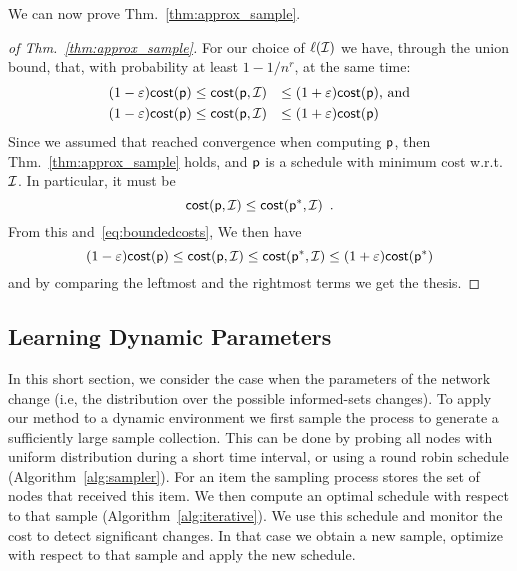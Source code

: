 We can now prove Thm.~\ref{thm:approx_sample}.
\begin{proof}[of Thm.~\ref{thm:approx_sample}]
	For our choice of $\ell(\mathcal{I})$ we have, through the union bound, that,
	with probability at least $1-1/n^r$, at the same time:
	\begin{align}\label{eq:boundedcosts}
		(1-\varepsilon)\mathsf{cost}(\mathsf{p})&\leq \mathsf{cost}(\mathsf{p},\mathcal{I}) &\le
		(1+\varepsilon)\mathsf{cost}(\mathsf{p}) & \mbox{, and}\\
		(1-\varepsilon)\mathsf{cost}(\mathsf{p})&\leq \mathsf{cost}(\mathsf{p},\mathcal{I}) &\le
		(1+\varepsilon)\mathsf{cost}(\mathsf{p})&\nonumber
	\end{align}
	Since we assumed that \algonameapx reached convergence when computing
	$\mathsf{p}$, then Thm.~\ref{thm:approx_sample} holds, and $\mathsf{p}$ is a
	schedule with minimum cost w.r.t.~$\mathcal{I}$. In particular, it must be
	\[
		\mathsf{cost}(\mathsf{p},\mathcal{I})\le \mathsf{cost}(\mathsf{p}^*,\mathcal{I})\enspace.
	\]
	From this and~\eqref{eq:boundedcosts}, We then have
	\[
		(1-\varepsilon)\mathsf{cost}(\mathsf{p})\leq \mathsf{cost}(\mathsf{p},\mathcal{I}) \le
		\mathsf{cost}(\mathsf{p}^*,\mathcal{I})\le (1+\varepsilon)\mathsf{cost}(\mathsf{p}^*)
	\]
	and by comparing the leftmost and the rightmost terms we get the thesis.
\end{proof}



\subsection{Learning Dynamic Parameters}\label{sec:dynamic}
In this short section, we consider the case when the parameters of the network change (i.e, the distribution over the possible informed-sets changes).  To apply our method to a dynamic environment we first sample the process to generate a sufficiently large sample collection. This can be done by probing
 all nodes with uniform distribution during a short time interval, or using a round robin schedule (Algorithm~\ref{alg:sampler}). For an item the sampling process stores the set of nodes that received this item. We then compute an optimal schedule with respect to that sample (Algorithm~\ref{alg:iterative}). We use this schedule and monitor the cost to detect significant changes. In that case we obtain a new sample, optimize with respect to that sample and apply the new schedule.

